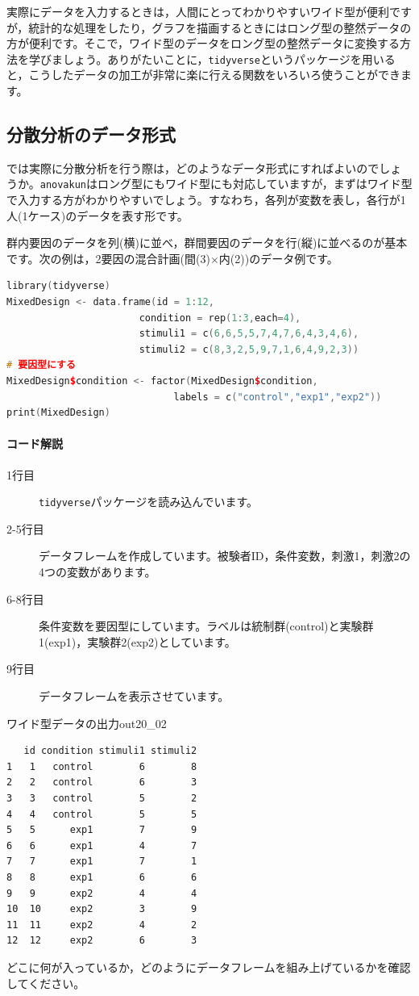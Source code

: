 \documentclass{ltjbook}
\begin{document}
実際にデータを入力するときは，人間にとってわかりやすいワイド型が便利ですが，統計的な処理をしたり，グラフを描画するときにはロング型の整然データの方が便利です。そこで，ワイド型のデータをロング型の整然データに変換する方法を学びましょう。ありがたいことに，\verb|tidyverse|というパッケージを用いると，こうしたデータの加工が非常に楽に行える関数をいろいろ使うことができます。

\subsection{分散分析のデータ形式}

では実際に分散分析を行う際は，どのようなデータ形式にすればよいのでしょうか。\verb|anovakun|はロング型にもワイド型にも対応していますが，まずはワイド型で入力する方がわかりやすいでしょう。すなわち，各列が変数を表し，各行が1人(1ケース)のデータを表す形です。

群内要因のデータを列(横)に並べ，群間要因のデータを行(縦)に並べるのが基本です。次の例は，2要因の混合計画(間(3)$\times$内(2))のデータ例です。

\begin{lstlisting}[language=c++,label={code:20_04},caption={データの準備}]
library(tidyverse)
MixedDesign <- data.frame(id = 1:12,
                       condition = rep(1:3,each=4),
                       stimuli1 = c(6,6,5,5,7,4,7,6,4,3,4,6),
                       stimuli2 = c(8,3,2,5,9,7,1,6,4,9,2,3))
# 要因型にする
MixedDesign$condition <- factor(MixedDesign$condition,
                             labels = c("control","exp1","exp2"))
print(MixedDesign)
\end{lstlisting}
\paragraph{コード解説}
\begin{description}
    \item[1行目] \verb|tidyverse|パッケージを読み込んでいます。
    \item[2-5行目] データフレームを作成しています。被験者ID，条件変数，刺激1，刺激2の4つの変数があります。
    \item[6-8行目] 条件変数を要因型にしています。ラベルは統制群(control)と実験群1(exp1)，実験群2(exp2)としています。
    \item[9行目] データフレームを表示させています。
\end{description}

\begin{Rscreen}{ワイド型データの出力}{out20_02}
\begin{verbatim}
   id condition stimuli1 stimuli2
1   1   control        6        8
2   2   control        6        3
3   3   control        5        2
4   4   control        5        5
5   5      exp1        7        9
6   6      exp1        4        7
7   7      exp1        7        1
8   8      exp1        6        6
9   9      exp2        4        4
10  10     exp2        3        9
11  11     exp2        4        2
12  12     exp2        6        3
\end{verbatim}
\end{Rscreen}
どこに何が入っているか，どのようにデータフレームを組み上げているかを確認してください。
\end{document}
